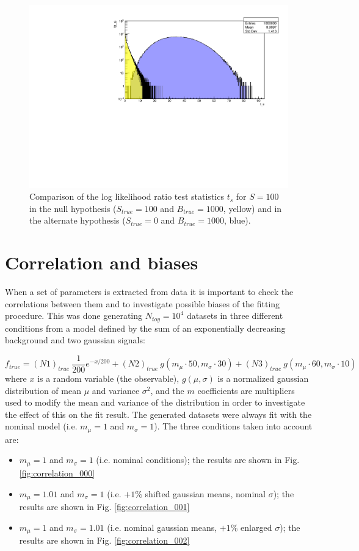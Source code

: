 \documentclass[10pt, oneside]{article}   	%
\begin{document}
\begin{figure}[h]
    \centering
    \includegraphics[width=\textwidth]{Ex3_B1000S100.pdf}
    \caption{Comparison of the log likelihood ratio test statistics $t_s$ for $S=100$ in the null hypothesis ($S_{true}=100$ and $B_{true}=1000$, yellow) and in the alternate hypothesis ($S_{true}=0$ and $B_{true} = 1000$, blue).}
    \label{fig:overlap_B1000S100N1e6}
\end{figure}

\section{Correlation and biases}
When a set of parameters is extracted from data it is important to check the correlations between them and to investigate possible biases of the fitting procedure. This was done generating $N_{toy} = 10^4$ datasets in three different conditions from a model defined by the sum of an exponentially decreasing background and two gaussian signals:

$$ f_{true} = (N1)_{true} \: \frac{1}{200} e^{-x/200} + (N2)_{true} \: g(m_{\mu}\cdot 50,m_{\sigma}\cdot 30) + (N3)_{true} \: g(m_{\mu}\cdot 60,m_{\sigma}\cdot 10)$$
where $x$ is a random variable (the observable), $g(\mu,\sigma)$ is a normalized gaussian distribution of mean $\mu$ and variance $\sigma^2$, and the $m$ coefficients are multipliers used to modify the mean and variance of the distribution in order to investigate the effect of this on the fit result. The generated datasets were always fit with the nominal model (i.e. $m_\mu = 1$ and $m_\sigma = 1$).
The three conditions taken into account are:
\begin{itemize}
\item $m_\mu = 1$ and $m_\sigma = 1$ (i.e. nominal conditions); the results are shown in Fig. \ref{fig:correlation_000}
\item $m_\mu = 1.01$ and $m_\sigma = 1$ (i.e. $+1\%$ shifted gaussian means, nominal $\sigma$); the results are shown in Fig. \ref{fig:correlation_001}	
\item $m_\mu = 1$ and $m_\sigma = 1.01$ (i.e. nominal gaussian means, $+1\%$ enlarged $\sigma$); the results are shown in Fig. \ref{fig:correlation_002}
\end{itemize}
\end{document}
